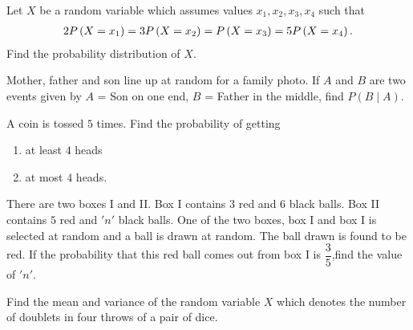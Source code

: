 \item Let $X$ be a random variable which assumes values $x_1, x_2, x_3, x_4$ such that 
\begin{align*}
2P\left(X = x_1\right) = 3P\left(X = x_2\right) = P\left(X = x_3\right) = 5P\left(X = x_4\right).
\end{align*}
Find the probability distribution of $X$.

\item Mother, father and son line up at random for a family photo. If $A$ and $B$ are two events given by $A$ = Son on one end, $B$ = Father in the middle, find $P(B\mid A)$.

\item A coin is tossed $5$ times. Find the probability of getting \begin{enumerate}[label=\roman*.]
    \item  at least $4$ heads
    \item at most $4$ heads.
    \end{enumerate}
    
    \item There are two boxes I and II. Box I contains $3$ red and $6$ black balls. Box II contains $5$ red and $'n'$ black balls. One of the two boxes, box I and box I is selected at random and a ball is drawn at random. The ball drawn is found to be red. If the probability that this red ball comes out from box I is $\dfrac{3}{5}$,find the value of $'n'$.

\item Find the mean and variance of the random variable $X$ which denotes the number of doublets in four throws of a pair of dice.


